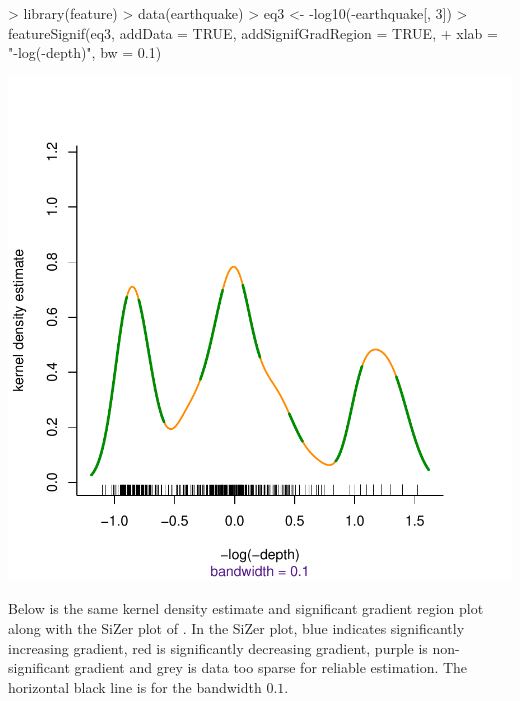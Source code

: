 \documentclass[a4paper,11pt]{article}
\begin{document}
\begin{center}
\begin{Schunk}
\begin{Sinput}
> library(feature)
> data(earthquake)
> eq3 <- -log10(-earthquake[, 3])
> featureSignif(eq3, addData = TRUE, addSignifGradRegion = TRUE, 
+     xlab = "-log(-depth)", bw = 0.1)
\end{Sinput}
\end{Schunk}
\includegraphics{feature-001}
\end{center}


Below is the same kernel density estimate and 
significant gradient region plot along with the SiZer plot of \citet*{chaudhuri99}.
In the SiZer plot, blue indicates significantly increasing gradient,
red is significantly decreasing gradient, purple is non-significant gradient
and grey is data too sparse for reliable estimation. The horizontal black line
is for the bandwidth $0.1$.
\end{document}
